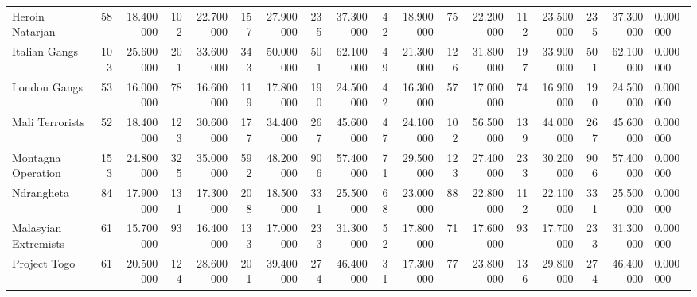 \begin{tabular}{lrrrrrrrrrrrrrrrrl}
Heroin Natarjan & 58 & 18.400000 & 102 & 22.700000 & 157 & 27.900000 & 235 & 37.300000 & 42 & 18.900000 & 75 & 22.200000 & 112 & 23.500000 & 235 & 37.300000 & 0.000000 \\
Italian Gangs & 103 & 25.600000 & 201 & 33.600000 & 343 & 50.000000 & 501 & 62.100000 & 49 & 21.300000 & 126 & 31.800000 & 197 & 33.900000 & 501 & 62.100000 & 0.000000 \\
London Gangs & 53 & 16.000000 & 78 & 16.600000 & 119 & 17.800000 & 190 & 24.500000 & 42 & 16.300000 & 57 & 17.000000 & 74 & 16.900000 & 190 & 24.500000 & 0.000000 \\
Mali Terrorists & 52 & 18.400000 & 123 & 30.600000 & 177 & 34.400000 & 267 & 45.600000 & 47 & 24.100000 & 102 & 56.500000 & 139 & 44.000000 & 267 & 45.600000 & 0.000000 \\
Montagna Operation & 153 & 24.800000 & 325 & 35.000000 & 592 & 48.200000 & 906 & 57.400000 & 71 & 29.500000 & 123 & 27.400000 & 233 & 30.200000 & 906 & 57.400000 & 0.000000 \\
Ndrangheta & 84 & 17.900000 & 131 & 17.300000 & 208 & 18.500000 & 331 & 25.500000 & 68 & 23.000000 & 88 & 22.800000 & 112 & 22.100000 & 331 & 25.500000 & 0.000000 \\
Malasyian Extremists & 61 & 15.700000 & 93 & 16.400000 & 133 & 17.000000 & 233 & 31.300000 & 52 & 17.800000 & 71 & 17.600000 & 93 & 17.700000 & 233 & 31.300000 & 0.000000 \\
Project Togo & 61 & 20.500000 & 124 & 28.600000 & 201 & 39.400000 & 274 & 46.400000 & 31 & 17.300000 & 77 & 23.800000 & 136 & 29.800000 & 274 & 46.400000 & 0.000000 \\
\end{tabular}
